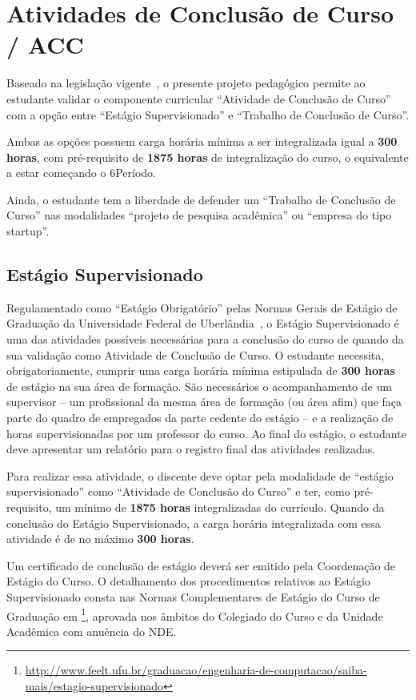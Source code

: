 \section{Atividades de Conclusão de Curso / ACC}
\label{sec:acc_conclusao}

Baseado na legislação vigente~\cite{MEC:CNE:CES:5:2016}, o presente projeto pedagógico permite ao estudante validar o componente curricular ``Atividade de Conclusão de Curso'' com a opção entre ``Estágio Supervisionado'' e ``Trabalho de Conclusão de Curso''.

Ambas as opções possuem carga horária mínima a ser integralizada igual a \textbf{300 horas}\unskip, com pré-requisito de \textbf{1875 horas} de integralização do curso, o equivalente a estar começando o 6 Período.

Ainda, o estudante tem a liberdade de defender um ``Trabalho de Conclusão de Curso'' nas modalidades ``projeto de pesquisa acadêmica'' ou ``empresa do tipo startup''.

\subsection{Estágio Supervisionado}

Regulamentado como ``Estágio Obrigatório'' pelas Normas Gerais de Estágio de Graduação da Universidade Federal de Uberlândia~\cite{UFU:CONGRAD:93:2023}, o Estágio Supervisionado é uma das atividades possíveis necessárias para a conclusão do curso de \ppccurso quando da sua validação como Atividade de Conclusão de Curso. O estudante necessita, obrigatoriamente, cumprir uma carga horária mínima estipulada de \textbf{300 horas} de estágio na sua área de formação. São necessários o acompanhamento de um supervisor -- um profissional da mesma área de formação (ou área afim) que faça parte do quadro de empregados da parte cedente do estágio -- e a realização de horas supervisionadas por um professor do curso. Ao final do estágio, o estudante deve apresentar um relatório para o registro final das atividades realizadas.

Para realizar essa atividade, o discente deve optar pela modalidade de ``estágio supervisionado'' como ``Atividade de Conclusão do Curso'' e ter, como pré-requisito, um mínimo de \textbf{1875 horas} integralizadas do currículo. Quando da conclusão do Estágio Supervisionado, a carga horária integralizada com essa atividade é de no máximo \textbf{300 horas}\unskip.

Um certificado de conclusão de estágio deverá ser emitido pela Coordenação de Estágio do Curso. O detalhamento dos procedimentos relativos ao Estágio Supervisionado consta nas Normas Complementares de Estágio do Curso de Graduação em \ppccurso\footnote{\url{http://www.feelt.ufu.br/graduacao/engenharia-de-computacao/saiba-mais/estagio-supervisionado}}, aprovada nos âmbitos do Colegiado do Curso e da Unidade Acadêmica com anuência do NDE.

